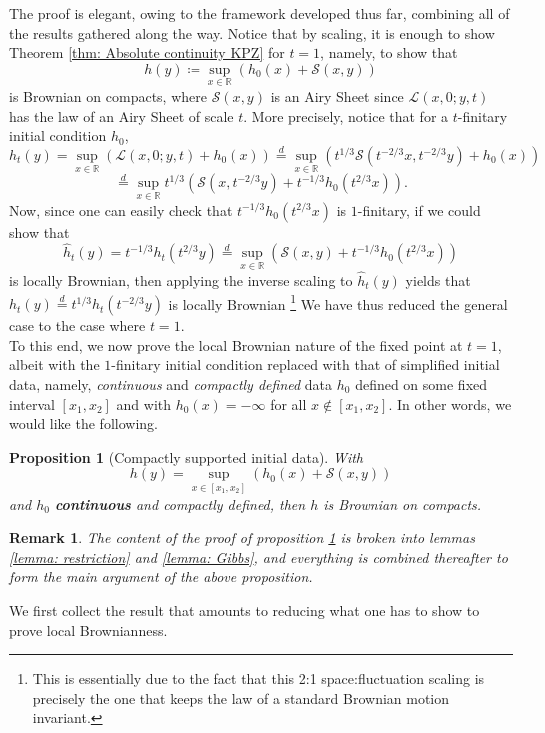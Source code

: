 \documentclass[12pt]{report}
\theoremstyle{plain}
\newtheorem{prop}[section]{Proposition}
\newtheorem*{remark}{Remark}
\newcommand{\R}{\ensuremath{\mathbb{R}}}
\begin{document}
The proof is elegant, owing to the framework developed thus far, combining all of the results gathered along the way. Notice that by scaling, it is enough to show Theorem \ref{thm: Absolute continuity KPZ} for $t = 1$, namely, to show that 
\[
h(y)\coloneqq \sup_{x\in \R} (h_0(x) + \mathcal{S}(x,y))
\]
is Brownian on compacts, where $\mathcal{S}(x,y)$ is an Airy Sheet since $\mathcal{L}(x, 0; y, t)$ has the law of an Airy Sheet of scale $t$. More precisely, notice that for a $t$-finitary initial condition $h_0$, 
\[
h_t(y) = \sup_{x\in\R}(\mathcal{L}(x,0;y,t)+h_0(x))\stackrel{d}{=} \sup_{x\in\R}(t^{1/3}\mathcal{S}(t^{-2/3}x,t^{-2/3}y)+h_0(x))
\]
\[
\stackrel{d}{=}  \sup_{x\in\R}t^{1/3}(\mathcal{S}(x,t^{-2/3}y)+t^{-1/3}h_0(t^{2/3}x)).
\]  
Now, since one can easily check that $t^{-1/3}h_0(t^{2/3}x)$ is $1$-finitary, if we could show that 
 \[
 \hat{h}_t(y) = t^{-1/3}h_t(t^{2/3}y) \stackrel{d}{=}  \sup_{x\in\R}(\mathcal{S}(x,y)+t^{-1/3}h_0(t^{2/3}x))
 \]
 is locally Brownian, then applying the inverse scaling to $\hat{h}_t(y)$ yields that $h_t(y) \stackrel{d}{=} t^{1/3}\hat{h}_t(t^{-2/3}y)$ is locally Brownian \footnote{This is essentially due to the fact that this 2:1 space:fluctuation scaling is precisely the one that keeps the law of a standard Brownian motion invariant.} We have thus reduced the general case to the case where $t = 1$.\\

To this end, we now prove the local Brownian nature of the fixed point at $t=1$, albeit with the $1$-finitary initial condition replaced with that of simplified initial data, namely, \textit{continuous} and \textit{compactly defined} data $h_0$ defined on some fixed interval $[x_1,x_2]$ and with $h_0(x)=-\infty$ for all $x\not\in[x_1,x_2]$. In other words, we would like the following. 

\begin{prop}[Compactly supported initial data]\label{prop: compactly supp data KPZ}
    With  \[
    h(y) = \sup_{x\in[x_1,x_2]}(h_0(x)+\mathcal{S}(x,y))\]
    and $h_0$ \textbf{continuous} and compactly defined, then $h$ is Brownian on compacts.
\end{prop}
\begin{remark}
    The content of the proof of proposition \ref{prop: compactly supp data KPZ} is broken into lemmas \ref{lemma: restriction} and \ref{lemma: Gibbs}, and everything is combined thereafter to form the main argument of the above proposition.
\end{remark}
We first collect the result that amounts to reducing what one has to show to prove local Brownianness.
\end{document}
